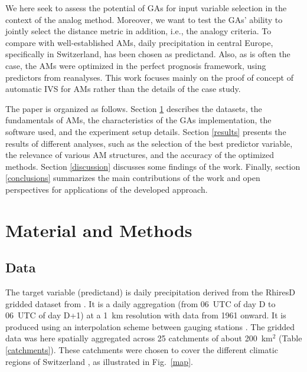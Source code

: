 \documentclass[draft]{agujournal2019}
\begin{document}
We here seek to assess the potential of GAs for input variable selection in the context of the analog method. Moreover, we want to test the GAs' ability to jointly select the distance metric in addition, i.e., the analogy criteria. To compare with well-established AMs, daily precipitation in central Europe, specifically in Switzerland, has been chosen as predictand. Also, as is often the case, the AMs were optimized in the perfect prognosis framework, using predictors from reanalyses. This work focuses mainly on the proof of concept of automatic IVS for AMs rather than the details of the case study.

The paper is organized as follows. Section \ref{material_methods} describes the datasets, the fundamentals of AMs, the characteristics of the GAs implementation, the software used, and the experiment setup details. Section \ref{results} presents the results of different analyses, such as the selection of the best predictor variable, the relevance of various AM structures, and the accuracy of the optimized methods. Section \ref{discussion} discusses some findings of the work. Finally, section \ref{conclusions} summarizes the main contributions of the work and open perspectives for applications of the developed approach.


\section{Material and Methods}
\label{material_methods}

\subsection{Data}
\label{data}

The target variable (predictand) is daily precipitation derived from the RhiresD gridded dataset from . It is a daily aggregation (from 06~UTC of day D to 06~UTC of day D+1) at a 1~km resolution with data from 1961 onward. It is produced using an interpolation scheme between gauging stations \cite{Frei1998}. The gridded data was here spatially aggregated across 25 catchments of about 200~km$^2$ (Table \ref{catchments}). These catchments were chosen to cover the different climatic regions of Switzerland \cite{Schuepp1980}, as illustrated in Fig.~\ref{map}.
\end{document}
